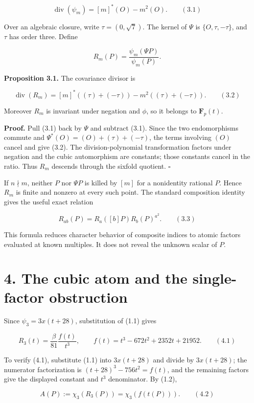 \documentclass[
  11pt,
  a4paper,
]{article}
\begin{document}
\[
\operatorname{div}(\psi_m)=[m]^*(O)-m^2(O). \qquad (3.1)
\]

Over an algebraic closure, write \(\tau=(0,\sqrt7)\). The kernel of
\(\Psi\) is \(\{O,\tau,-\tau\}\), and \(\tau\) has order three. Define

\[
R_m(P)=\frac{\psi_m(\Psi P)}{\psi_m(P)}.
\]

\textbf{Proposition 3.1.} The covariance divisor is

\[
\operatorname{div}(R_m)=[m]^*((\tau)+(-\tau))-m^2((\tau)+(-\tau)). \qquad (3.2)
\]

Moreover \(R_m\) is invariant under negation and \(\phi\), so it belongs
to \(\mathbf F_p(t)\).

\textbf{Proof.} Pull (3.1) back by \(\Psi\) and subtract (3.1). Since
the two endomorphisms commute and \(\Psi^*(O)=(O)+(\tau)+(-\tau)\), the
terms involving \((O)\) cancel and give (3.2). The division-polynomial
transformation factors under negation and the cubic automorphism are
constants; those constants cancel in the ratio. Thus \(R_m\) descends
through the sixfold quotient. \(\square\)

If \(n\nmid m\), neither \(P\) nor \(\Psi P\) is killed by \([m]\) for a
nonidentity rational \(P\). Hence \(R_m\) is finite and nonzero at every
such point. The standard composition identity gives the useful exact
relation

\[
R_{ab}(P)=R_a([b]P)R_b(P)^{a^2}. \qquad (3.3)
\]

This formula reduces character behavior of composite indices to atomic
factors evaluated at known multiples. It does not reveal the unknown
scalar of \(P\).

\section{4. The cubic atom and the single-factor
obstruction}\label{the-cubic-atom-and-the-single-factor-obstruction}

Since \(\psi_3=3x(t+28)\), substitution of (1.1) gives

\[
R_3(t)=\frac{\beta}{81}\frac{f(t)}{t^3},\qquad
f(t)=t^3-672t^2+2352t+21952. \qquad (4.1)
\]

To verify (4.1), substitute (1.1) into \(3x(t+28)\) and divide by
\(3x(t+28)\); the numerator factorization is \((t+28)^3-756t^2=f(t)\),
and the remaining factors give the displayed constant and \(t^3\)
denominator. By (1.2),

\[
A(P):=\chi_3(R_3(P))=\chi_3(f(t(P))). \qquad (4.2)
\]
\end{document}
